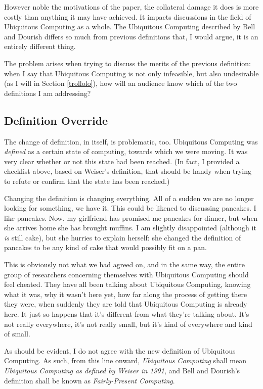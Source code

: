 However noble the motivations of the paper, the collateral damage it does is more costly than anything it may have
achieved. It impacts discussions in the field of Ubiquitous Computing as a whole. The Ubiquitous Computing described
by Bell and Dourish differs so much from previous definitions that, I would argue, it is an entirely different
thing.

The problem arises when trying to discuss the merits of the previous definition: when I say that Ubiquitous
Computing is not only infeasible, but also undesirable (as I will in Section \ref{trollolo}), how will an audience
know which of the two definitions I am addressing?

\subsection*{Definition Override}

The change of definition, in itself, is problematic, too. Ubiquitous Computing was \emph{defined} as a certain state
of computing, towards which we were moving. It was very clear whether or not this state had been reached. (In fact,
I provided a checklist above, based on Weiser's definition, that should be handy when trying to refute or confirm that
the state has been reached.)

Changing the definition is changing everything. All of a sudden we are no longer looking
for something, we have it. This could be likened to discussing pancakes. I like pancakes. Now, my girlfriend has
promised me pancakes for dinner, but when she arrives home she has brought muffins. I am slightly disappointed (although
it \emph{is} still cake), but she hurries to explain herself: she changed the definition of pancakes to be any kind
of cake that would possibly fit on a pan.

This is obviously not what we had agreed on, and in the same way, the entire
group of researchers concerning themselves with Ubiquitous Computing should feel cheated. They have all been talking
about Ubiquitous Computing, knowing what it was, why it wasn't here yet, how far along the process of getting there
they were, when suddenly they are told that Ubiquitous Computing is already here. It just so happens that it's different
from what they're talking about. It's not really everywhere, it's not really small, but it's kind of everywhere and kind
of small.

As should be evident, I do not agree with the new definition of Ubiquitous Computing. As such, from this line onward,
\emph{Ubiquitous Computing} shall mean \emph{Ubiquitous Computing as defined by Weiser in 1991}, and Bell and Dourish's
definition shall be known as \emph{Fairly-Present Computing}.